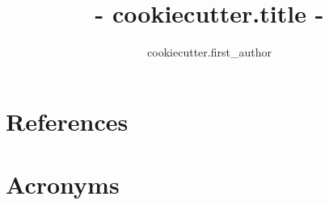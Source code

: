 \documentclass[{{ cookiecutter.org }},authoryear,toc]{lsstdoc}
\title{ {{- cookiecutter.title -}} }
\author{%
{{ cookiecutter.first_author }}
}
\date{\vcsDate}
\begin{document}
\maketitle


\appendix
\section{References} \label{sec:bib}


\section{Acronyms} \label{sec:acronyms}

\end{document}
